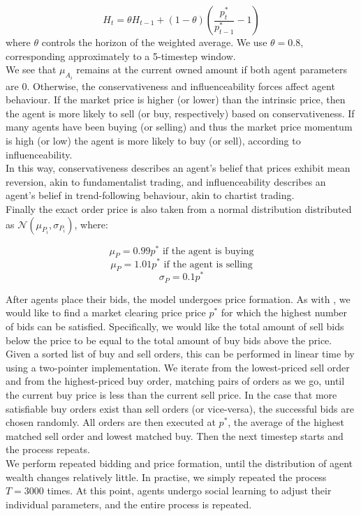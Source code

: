 \documentclass[11pt]{article}
\begin{document}
\begin{equation}
H_t = \theta H_{t-1} + (1 - \theta)(\frac{p^*_t}{p^*_{t-1}} - 1)
\end{equation}
where $\theta$ controls the horizon of the weighted average. We use $\theta=0.8$, corresponding approximately to a 5-timestep window. \\
We see that $\mu_{A_i}$ remains at the current owned amount if both agent parameters are $0$. Otherwise, the conservativeness and influenceability forces affect agent behaviour. If the market price is higher (or lower) than the intrinsic price, then the agent is more likely to sell (or buy, respectively) based on conservativeness. If many agents have been buying (or selling) and thus the market price momentum is high (or low) the agent is more likely to buy (or sell), according to influenceability.\\
In this way, conservativeness describes an agent's belief that prices exhibit mean reversion, akin to fundamentalist trading, and influenceability describes an agent's belief in trend-following behaviour, akin to chartist trading. \\
Finally the exact order price is also taken from a normal distribution distributed as $\mathcal{N}(\mu_{P_i}, \sigma_{P_i})$, where:

\begin{equation}
\mu_P = 0.99 p^* \text{ if the agent is buying}
\end{equation}
\begin{equation}
\mu_P = 1.01 p^* \text{ if the agent is selling}
\end{equation}
\begin{equation}
\sigma_P = 0.1p^*
\end{equation}

After agents place their bids, the model undergoes price formation. As with \citet{de1990noise}, we would like to find a market clearing price price $p^*$ for which the highest number of bids can be satisfied. Specifically, we would like the total amount of sell bids below the price to be equal to the total amount of buy bids above the price. Given a sorted list of buy and sell orders, this can be performed in linear time by using a two-pointer implementation. We iterate from the lowest-priced sell order and from the highest-priced buy order, matching pairs of orders as we go, until the current buy price is less than the current sell price. In the case that more satisfiable buy orders exist than sell orders (or vice-versa), the successful bids are chosen randomly. All orders are then executed at $p^*$, the average of the highest matched sell order and lowest matched buy. Then the next timestep starts and the process repeats. \\
We perform repeated bidding and price formation, until the distribution of agent wealth changes relatively little. In practise, we simply repeated the process $T=3000$ times. At this point, agents undergo social learning to adjust their individual parameters, and the entire process is repeated. \\
\end{document}

